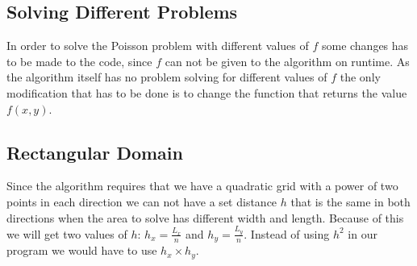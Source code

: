 \documentclass[a4paper, 12pt]{article}
\begin{document}
	\subsection{Solving Different Problems}
	In order to solve the Poisson problem with different values of $f$ some changes has to be made to the code, since $f$ can not be given to the algorithm on runtime. As the algorithm itself has no problem solving for different values of $f$ the only modification that has to be done is to change the function that returns the value $f(x, y)$.

	\subsection{Rectangular Domain}
	Since the algorithm requires that we have a quadratic grid with a power of two points in each direction we can not have a set distance $h$ that is the same in both directions when the area to solve has different width and length. Because of this we will get two values of $h$: $h_x = \frac{L_x}{n}$ and $h_y = \frac{L_y}{n}$. Instead of using $h^2$ in our program we would have to use $h_x\times h_y$.
    
\end{document}
